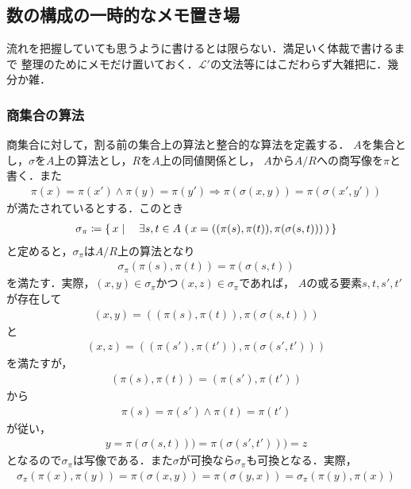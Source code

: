 \subsection{数の構成の一時的なメモ置き場}
	流れを把握していても思うように書けるとは限らない．満足いく体裁で書けるまで
	整理のためにメモだけ置いておく．$\mathcal{L}'$の文法等にはこだわらず大雑把に．幾分か雑．
	
\subsubsection{商集合の算法}
	商集合に対して，割る前の集合上の算法と整合的な算法を定義する．
	$A$を集合とし，$\sigma$を$A$上の算法とし，$R$を$A$上の同値関係とし，
	$A$から$A/R$への商写像を$\pi$と書く．また
	\begin{align}
		\pi(x) = \pi(x') \wedge \pi(y) = \pi(y')
		\Longrightarrow \pi\left(\sigma(x,y)\right) = \pi\left(\sigma(x',y')\right)
	\end{align}
	が満たされているとする．このとき
	\begin{align}
		\sigma_\pi \coloneqq \left\{\, x \mid \quad \exists s,t \in A\, 
		\left(\, x=((\pi(s),\pi(t)),\pi(\sigma(s,t)))\, \right)\, \right\}
	\end{align}
	と定めると，$\sigma_\pi$は$A/R$上の算法となり
	\begin{align}
		\sigma_\pi(\pi(s),\pi(t)) = \pi(\sigma(s,t))
	\end{align}
	を満たす．実際，$(x,y) \in \sigma_\pi$かつ$(x,z) \in \sigma_\pi$であれば，
	$A$の或る要素$s,t,s',t'$が存在して
	\begin{align}
		(x,y) = ((\pi(s),\pi(t)),\pi(\sigma(s,t)))
	\end{align}
	と
	\begin{align}
		(x,z) = ((\pi(s'),\pi(t')),\pi(\sigma(s',t')))
	\end{align}
	を満たすが，
	\begin{align}
		(\pi(s),\pi(t)) = (\pi(s'),\pi(t'))
	\end{align}
	から
	\begin{align}
		\pi(s) = \pi(s') \wedge \pi(t) = \pi(t')
	\end{align}
	が従い，
	\begin{align}
		y = \pi(\sigma(s,t))) = \pi(\sigma(s',t'))) = z
	\end{align}
	となるので$\sigma_\pi$は写像である．また$\sigma$が可換なら$\sigma_\pi$も可換となる．実際，
	\begin{align}
		\sigma_\pi(\pi(x),\pi(y)) = \pi(\sigma(x,y))
		= \pi(\sigma(y,x)) = \sigma_\pi(\pi(y),\pi(x))
	\end{align}
